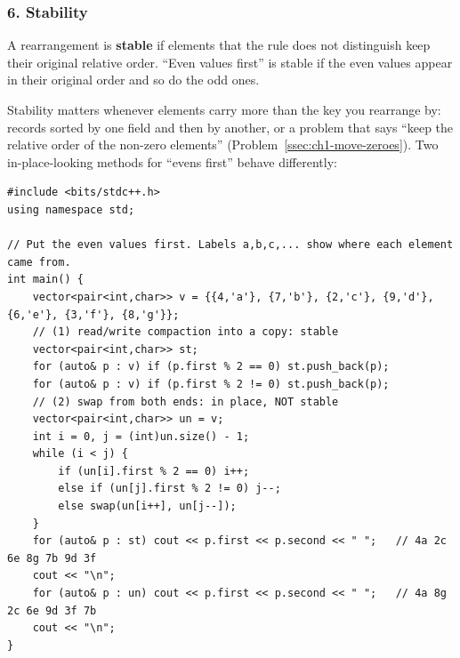 \subsubsection*{6. Stability}

\begin{definitionbox}
A rearrangement is \textbf{stable} if elements that the rule does not distinguish keep their original relative order. ``Even values first'' is stable if the even values appear in their original order and so do the odd ones.
\end{definitionbox}

Stability matters whenever elements carry more than the key you rearrange by: records sorted by one field and then by another, or a problem that says ``keep the relative order of the non-zero elements'' (Problem~\ref{ssec:ch1-move-zeroes}). Two in-place-looking methods for ``evens first'' behave differently:

\begin{lstlisting}[style=cpp]
#include <bits/stdc++.h>
using namespace std;

// Put the even values first. Labels a,b,c,... show where each element came from.
int main() {
    vector<pair<int,char>> v = {{4,'a'}, {7,'b'}, {2,'c'}, {9,'d'}, {6,'e'}, {3,'f'}, {8,'g'}};
    // (1) read/write compaction into a copy: stable
    vector<pair<int,char>> st;
    for (auto& p : v) if (p.first % 2 == 0) st.push_back(p);
    for (auto& p : v) if (p.first % 2 != 0) st.push_back(p);
    // (2) swap from both ends: in place, NOT stable
    vector<pair<int,char>> un = v;
    int i = 0, j = (int)un.size() - 1;
    while (i < j) {
        if (un[i].first % 2 == 0) i++;
        else if (un[j].first % 2 != 0) j--;
        else swap(un[i++], un[j--]);
    }
    for (auto& p : st) cout << p.first << p.second << " ";   // 4a 2c 6e 8g 7b 9d 3f
    cout << "\n";
    for (auto& p : un) cout << p.first << p.second << " ";   // 4a 8g 2c 6e 9d 3f 7b
    cout << "\n";
}
\end{lstlisting}

\begin{diagrambox}
\end{diagrambox}

